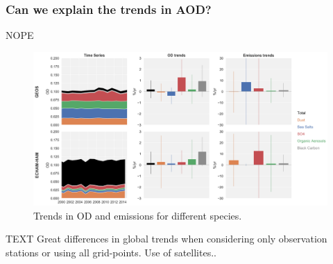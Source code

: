 \documentclass[journal abbreviation, manuscript]{copernicus}
\begin{document}
\subsubsection{Can we explain the trends in AOD?}
NOPE
\begin{figure}
 \includegraphics[width=\columnwidth]{../scripts/figs/species_trends.png}
 \caption{Trends in OD and emissions for different species.}
 \label{species_abs_trends}
\end{figure}


\conclusions  %
TEXT
Great differences in global trends when considering only observation stations or using all grid-points. Use of satellites..












\appendix
\section{}    %
\end{document}

